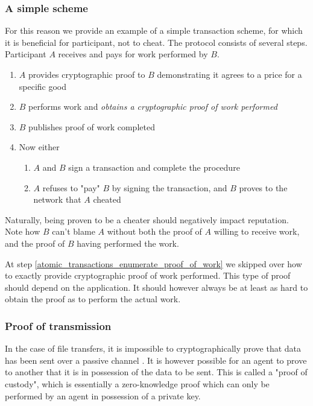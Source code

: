 \subsubsection{A simple scheme}
For this reason we provide an example of a simple transaction scheme, 
for which it is beneficial for participant, not to cheat. 
The protocol consists of several steps. 
Participant $A$ receives and pays for work performed by $B$.
\begin{enumerate}
	\item $A$ provides cryptographic proof to $B$ demonstrating it agrees to a price for a specific good
	\item \label{atomic_transactions_enumerate_proof_of_work}$B$ performs work and \emph{obtains a cryptographic proof of work performed}
	\item $B$ publishes proof of work completed
	\item Now either 
	\begin{enumerate}
		\item $A$ and $B$ sign a transaction and complete the procedure
		\item $A$ refuses to "pay" $B$ by signing the transaction, 
		and $B$ proves to the network that $A$ cheated
	\end{enumerate}
\end{enumerate}
Naturally, being proven to be a cheater should negatively impact reputation. 
Note how $B$ can't blame $A$ without both the proof of $A$ willing to receive work, 
and the proof of $B$ having performed the work.

At step \ref{atomic_transactions_enumerate_proof_of_work} we skipped over how to exactly provide cryptographic proof of work performed. 
This type of proof should depend on the application. 
It should however always be at least as hard to obtain the proof as to perform the actual work.

\subsubsection{Proof of transmission}\label{sssection:proof_of_transmission}
In the case of file transfers, 
it is impossible to cryptographically prove that data has been sent over a passive channel \cite{kravchenko}. 
It is however possible for an agent to prove to another that it is in possession of the data to be sent. 
This is called a "proof of custody", which is essentially a zero-knowledge proof which can only be performed by an agent in possession of a private key.

